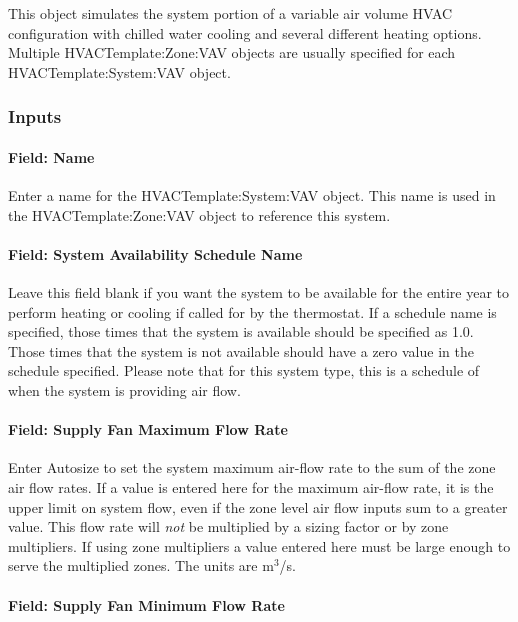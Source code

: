 This object simulates the system portion of a variable air volume HVAC configuration with chilled water cooling and several different heating options. Multiple HVACTemplate:Zone:VAV objects are usually specified for each HVACTemplate:System:VAV object.

\subsubsection{Inputs}\label{inputs-18-002}

\paragraph{Field: Name}\label{field-name-5-010}

Enter a name for the HVACTemplate:System:VAV object. This name is used in the HVACTemplate:Zone:VAV object to reference this system.

\paragraph{Field: System Availability Schedule Name}\label{field-system-availability-schedule-name-10}

Leave this field blank if you want the system to be available for the entire year to perform heating or cooling if called for by the thermostat. If a schedule name is specified, those times that the system is available should be specified as 1.0. Those times that the system is not available should have a zero value in the schedule specified. Please note that for this system type, this is a schedule of when the system is providing air flow.

\paragraph{Field: Supply Fan Maximum Flow Rate}\label{field-supply-fan-maximum-flow-rate-1}

Enter Autosize to set the system maximum air-flow rate to the sum of the zone air flow rates. If a value is entered here for the maximum air-flow rate, it is the upper limit on system flow, even if the zone level air flow inputs sum to a greater value. This flow rate will \emph{not} be multiplied by a sizing factor or by zone multipliers. If using zone multipliers a value entered here must be large enough to serve the multiplied zones. The units are m\(^{3}\)/s.

\paragraph{Field: Supply Fan Minimum Flow Rate}\label{field-supply-fan-minimum-flow-rate}

